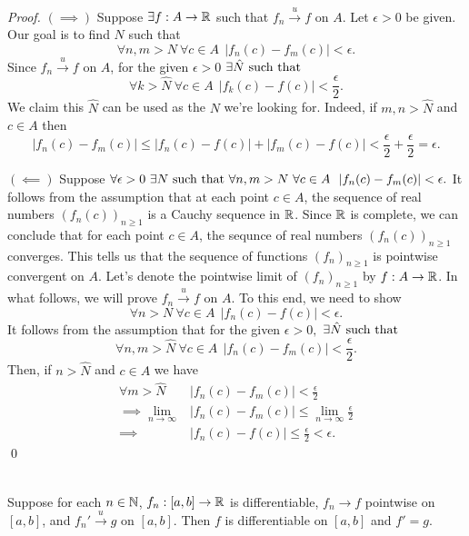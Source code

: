 \begin{proof}
    $(\implies)$ Suppose $\exists f: A \to \mathbb{R}$ such that $f_n \overset{u}{\to}f$ on $A$. Let $\epsilon > 0$ be given. Our goal is to find $N$ such that 
    $$\forall n,m > N ~\forall c \in A ~~|f_n(c) - f_m(c)| <\epsilon.$$
    Since $f_n \overset{u}{\to}f$ on $A$, for the given $\epsilon > 0$ $\exists \hat{N} \text{ such that }$
    $$\forall k > \hat{N} ~\forall c \in A ~~|f_k(c) - f(c)| < \frac{\epsilon}{2}.$$
    We claim this $\hat{N}$ can be used as the $N$ we're looking for. Indeed, if $m,n > \hat{N}$ and $c \in A$ then
    $$|f_n(c) - f_m(c)| \leq |f_n(c) - f(c)| + |f_m(c) - f(c)| < \frac{\epsilon}{2} + \frac{\epsilon}{2} = \epsilon.$$

    $(\impliedby)$ Suppose $\forall \epsilon > 0 ~\exists N \text{ such that } \forall n,m > N ~\forall c \in A ~~|f_n(c) - f_m(c)| < \epsilon.$ It follows from the assumption that at each point $c \in A$, the sequence of real numbers $(f_n(c))_{n\geq 1}$ is a Cauchy sequence in $\mathbb{R}$. Since $\mathbb{R}$ is complete, we can conclude that for each point $c \in A$, the sequnce of real numbers $(f_n(c))_{n\geq 1}$ converges. This tells us that the sequence of functions $(f_n)_{n\geq 1}$ is pointwise convergent on $A$. Let's denote the pointwise limit of $(f_n)_{n\geq 1}$ by $f: A \to \mathbb{R}$. In what follows, we will prove $f_n \overset{u}{\to}f$ on $A$. To this end, we need to show
    $$\forall n > N ~\forall c \in A ~~|f_n(c) - f(c)| < \epsilon.$$
    It follows from the assumption that for the given $\epsilon > 0,$ $\exists \hat{N} \text{ such that }$
    $$\forall n,m > \hat{N} ~\forall c \in A ~~|f_n(c) - f_m(c)| < \frac{\epsilon}{2}.$$
    Then, if $n > \hat{N}$ and $c \in A$ we have 
    \begin{align*}
        \forall m > \hat{N} ~~&|f_n(c) - f_m(c)| < \frac{\epsilon}{2} \\
        \implies \lim_{n\to \infty}&|f_n(c) - f_m(c)| \leq \lim_{n\to \infty} \frac{\epsilon}{2} \\
        \implies &|f_n(c) - f(c)| \leq \frac{\epsilon}{2} < \epsilon.
    \end{align*}
    \qed
\end{proof}

\begin{theorem} \leavevmode \\
    \label{Thm7.17}
    Suppose for each $n \in \mathbb{N}$, $f_n:[a,b] \to \mathbb{R}$ is differentiable, $f_n \to f$ pointwise on $[a,b]$, and $f_n' \overset{u}{\to} g$ on $[a,b].$ Then $f$ is differentiable on $[a,b]$ and $f' = g.$
\end{theorem}

